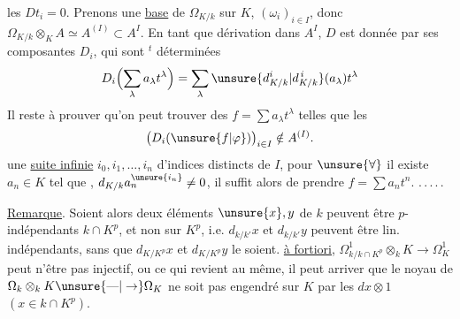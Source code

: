 


les $Dt_i=0$.  Prenons une
\uline{base} de $\Omega_{K/k}$ sur $K$,  $(\omega_i)_{i\in I}$,
donc $\Omega_{K/k}\otimes_K A\simeq A^{(I)}\subset A^I$. En tant
que dérivation dans $A^I$, $D$ est donnée
par ses composantes $D_i$, qui sont
$^t$ déterminées
\[
D_i\Bigl(\sum_\lambda a_\lambda t^\lambda\Bigr)
=\sum_\lambda \unsure{d^i_{K/k}|d_{K/k}^{\,i}}(a_\lambda)t^\lambda
\]
Il reste à prouver qu'on peut trouver
des $f=\sum a_\lambda t^\lambda$ telles que les
\[
\bigl(D_i(\unsure{f|\varphi})\bigr)_{i\in I}\notin A^{(I)}.
\]
une \uline{suite infinie} $i_0,i_1,\ldots,i_n$
d'indices distincts de $I$,  pour $\unsure{\forall}$
 il existe $a_n\in K$ tel que
,
$d_{K/k}a_n^{\unsure{i_n}}\ne0$, il suffit alors de
prendre $f=\sum a_nt^n$. .\,.\,.\,.\,.






\uline{Remarque}. Soient
alors deux éléments $\unsure{x},y$ de $k$ peuvent être
$p$-indépendants 
 $k\cap K^p$, et non
 sur $K^p$,
i.e. $d_{k/k'}x$ et $d_{k/k'}y$ peuvent être lin. indépendants,
sans que $d_{K/K^p}x$ et $d_{K/K^p}y$ le soient.
\uline{à fortiori}, $\Omega^1_{k/k\cap K^p}\otimes_k K\to\Omega^1_K$
peut n'être pas injectif, ou  ce qui revient
au même, il peut arriver que le noyau 
de $\Omega_k\otimes_k K\unsure{\text{---}|\to}\Omega_K$ ne soit pas engendré sur $K$
par les $dx\otimes1$ $(x\in k\cap K^p)$.

